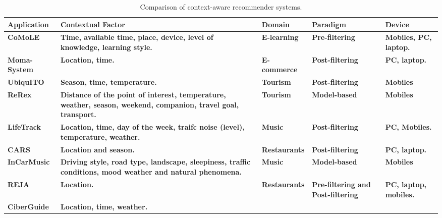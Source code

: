 \begin{sidewaystable}[]
  \caption{Comparison of context-aware recommender systems.}
  \label{tab:stateoftheart}
  \bigskip
    \centering\small\setlength\tabcolsep{2pt}
        \hspace*{-1cm}\begin{tabular}{p{3.5cm} p{6cm} p{4cm} p{3cm} p{3cm} }
           \toprule
             \textbf{Application} &\textbf{Contextual Factor} &\textbf{Domain} &
             \textbf{Paradigm} &\textbf{Device}  \\ \hline
           \midrule
             \textbf{CoMoLE} & \textbf{Time, available time, place, device, level of
            knowledge, learning style.} & \textbf{E-learning} & \textbf{Pre-filtering} 
             & \textbf{Mobiles, PC, laptop.}   \\ \hline 
             \textbf{Moma-System} & \textbf{Location, time.} & 
             \textbf{E-commerce} & \textbf{Post-filtering} & \textbf{PC, laptop.}  \\ 
             \hline
             \textbf{UbiquITO} & \textbf{Season, time, temperature.} & 
             \textbf{Tourism} & \textbf{Post-filtering} & \textbf{Mobiles} \\ \hline
             \textbf{ReRex} & \textbf{Distance of the point of interest,  temperature,
             weather, season, weekend, companion, travel goal, transport.} & 
             \textbf{Tourism} & \textbf{Model-based} & \textbf{Mobiles} \\ \hline
             \textbf{LifeTrack} & \textbf{Location, time, day of the week, traifc noise
             (level), temperature, weather.} & \textbf{Music} & \textbf{ Post-filtering} 
             & \textbf{PC, Mobiles.} \\ \hline
             \textbf{CARS} & \textbf{Location and season.} & \textbf{Restaurants} & 
             \textbf{Post-filtering} & \textbf{PC, laptop.} \\ \hline
             \textbf{InCarMusic} & \textbf{Driving style, road type, landscape, 
             sleepiness, traffic conditions, mood weather and natural phenomena.}
            & \textbf{Music} & \textbf{Model-based} & \textbf{Mobiles} \\ \hline
            \textbf{REJA} & \textbf{Location.} & \textbf{Restaurants} & 
            \textbf{Pre-filtering and Post-filtering} & \textbf{PC, laptop, mobiles.} \\ 
            \hline
            \textbf{CiberGuide} & \textbf{Location, time, weather.} & 

\end{tabular}
\end{sidewaystable}

